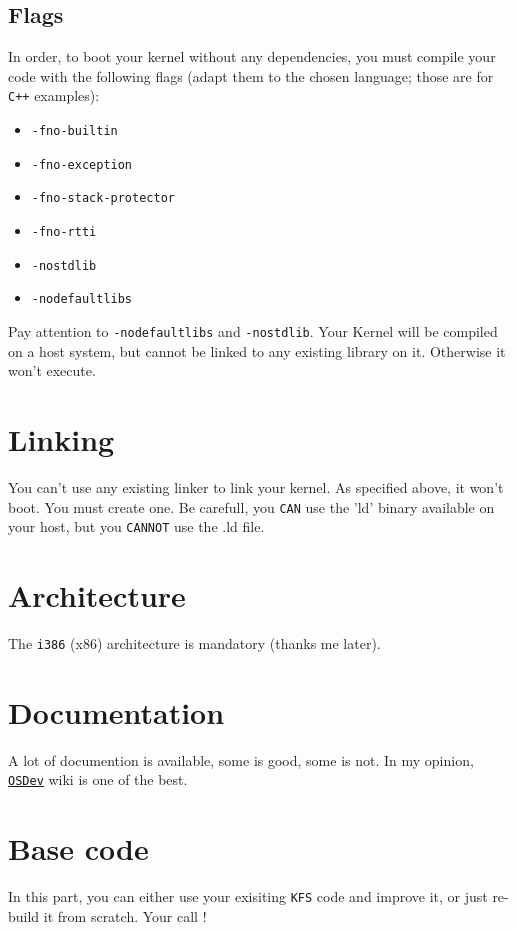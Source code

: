 \documentclass{42-en}
\begin{document}
		\subsection{Flags}
			In order, to boot your kernel without any dependencies,
            you must compile your code with the following flags (adapt
            them to the chosen language; those are for \texttt{C++}
            examples):
			\begin{itemize}\itemsep1pt
				\item \texttt{-fno-builtin}
				\item \texttt{-fno-exception}
				\item \texttt{-fno-stack-protector}
				\item \texttt{-fno-rtti}
				\item \texttt{-nostdlib}
				\item \texttt{-nodefaultlibs}
			\end{itemize}
			Pay attention to \texttt{-nodefaultlibs} and
            \texttt{-nostdlib}.  Your Kernel will be compiled on a
            host system, but cannot be linked to any existing library
            on it. Otherwise it won't execute.
	\section{Linking}
		You can't use any existing linker to link your kernel.  As
        specified above, it won't boot. You must create one.  Be
        carefull, you \texttt{CAN} use the 'ld' binary available on
        your host, but you \texttt{CANNOT} use the .ld file.
	\section{Architecture}
		The \texttt{i386} (x86) architecture is mandatory (thanks me
        later).
	\section{Documentation}
		A lot of documention is available, some is good, some is not.
		In my opinion, \texttt{\href{http://wiki.osdev.org/Main_Page}
		{OSDev}} wiki is one of the best.
	\section{Base code}
		In this part, you can either use your exisiting \texttt{KFS}
        code and improve it, or just re-build it from scratch. Your
        call !
\end{document}
